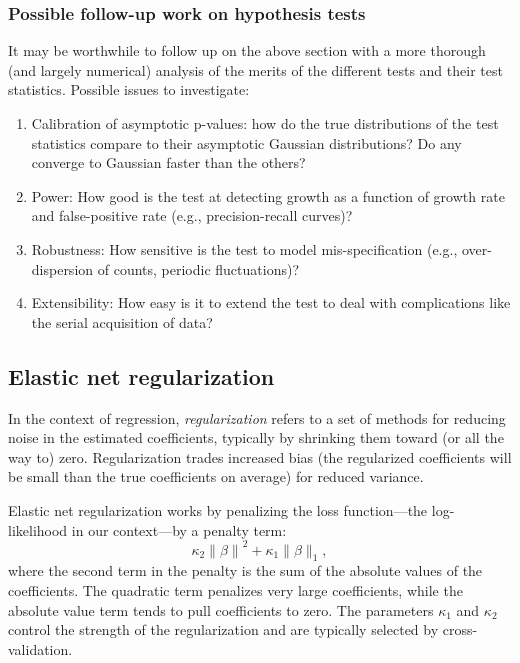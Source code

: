 \documentclass[12pt, letterpaper]{article}
\begin{document}
\subsubsection{Possible follow-up work on hypothesis tests}

It may be worthwhile to follow up on the above section with a more thorough (and largely numerical) analysis of the merits of the different tests and their test statistics.
Possible issues to investigate:
\begin{enumerate}
    \item Calibration of asymptotic p-values: how do the true distributions of the test statistics compare to their asymptotic Gaussian distributions? Do any converge to Gaussian faster than the others?
    \item Power: How good is the test at detecting growth as a function of growth rate and false-positive rate (e.g., precision-recall curves)?
    \item Robustness: How sensitive is the test to model mis-specification (e.g., over-dispersion of counts, periodic fluctuations)?
    \item Extensibility: How easy is it to extend the test to deal with complications like the serial acquisition of data?
\end{enumerate}

\subsection{Elastic net regularization}

In the context of regression, \emph{regularization} refers to a set of methods for reducing noise in the estimated coefficients, typically by shrinking them toward (or all the way to) zero.
Regularization trades increased bias (the regularized coefficients will be small than the true coefficients on average) for reduced variance.

Elastic net regularization works by penalizing the loss function---the log-likelihood in our context---by a penalty term:
\begin{equation}
    \kappa_2 {\| \beta \|}^2 + \kappa_1 \| \beta \|_1,
\end{equation}
where the second term in the penalty is the sum of the absolute values of the coefficients.
The quadratic term penalizes very large coefficients, while the absolute value term tends to pull coefficients to zero.
The parameters $\kappa_1$ and $\kappa_2$ control the strength of the regularization and are typically selected by cross-validation.
\end{document}
